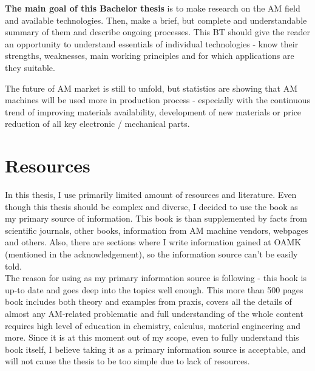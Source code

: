 \documentclass[a4paper, twoside, 11pt]{report}
\begin{document}
	\textbf{The main goal of this Bachelor thesis} is to make research on the AM field and available technologies. Then, make a brief, but complete and understandable summary of them and describe ongoing processes. This BT should give the reader an opportunity to understand essentials of individual technologies - know their strengths, weaknesses, main working principles and for which applications are they suitable.
	
	The future of AM market is still to unfold, but statistics are showing that AM machines will be used more in production process - especially with the continuous trend of improving materials availability, development of new materials or price reduction of all key electronic / mechanical parts. \newpage
%
\section{Resources}
In this thesis, I use primarily limited amount of resources and literature. Even though this thesis should be complex and diverse, I decided to use the book \cite{AMT} as my primary source of information. This book is than supplemented by facts from scientific journals, other books, information from AM machine vendors, webpages and others. Also, there are sections where I write information gained at OAMK (mentioned in the acknowledgement), so the information source can't be easily told.\\
The reason for using \cite{AMT} as my primary information source is following - this book is up-to date and goes deep into the topics well enough. This more than 500 pages book includes both theory and examples from praxis, covers all the details of almost any AM-related problematic and full understanding of the whole content requires high level of education in chemistry, calculus, material engineering and more. Since it is at this moment out of my scope, even to fully understand this book itself, I believe taking it as a primary information source is acceptable, and will not cause the thesis to be too simple due to lack of resources.
%
\end{document}
